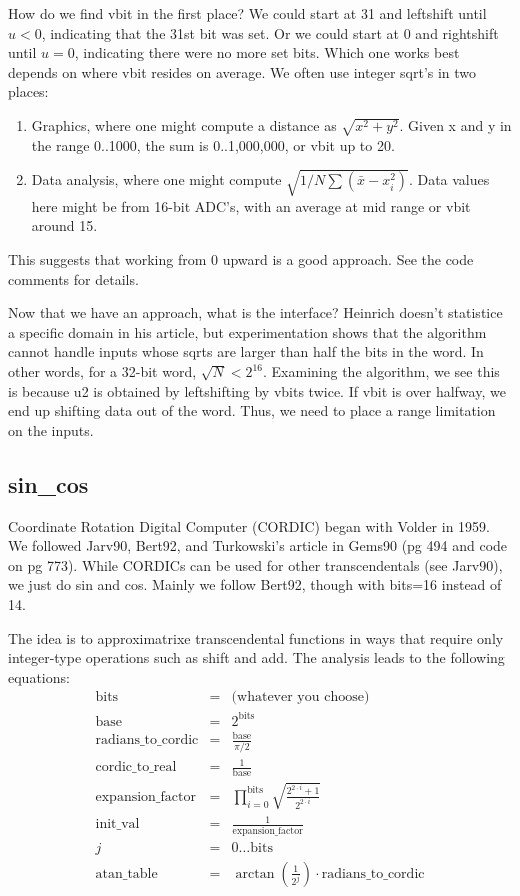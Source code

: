 How do we find vbit in the first place?  
We could start at 31 and leftshift 
until $u<0$, indicating that the 31st bit was set.  Or we could
start at 0 and rightshift until $u=0$, indicating there were no
more set bits. Which one works best depends on where vbit
resides on average.  We often use integer sqrt's in two places:
\begin{enumerate}
\item Graphics, where one might compute a distance as $\sqrt{x^2+y^2}$.  
Given x and y in the range 0..1000, the sum is 0..1,000,000, or
vbit up to 20.
\item Data analysis, where one might compute $\sqrt{1/N\sum{(\bar{x}-x_i^2)}}$.  
Data values here might be from 16-bit ADC's, with an average at mid range
or vbit around 15.  
\end{enumerate}

This suggests that working from 0 upward is a good approach.  
See the code comments for details.

Now that we have an approach, what is the interface?  Heinrich doesn't
statistice a specific domain in his article, but experimentation shows
that the algorithm cannot handle inputs whose sqrts are 
larger than half the bits in the word.  In other words, for a 32-bit word, 
$\sqrt{N} < 2^{16}$.  Examining the algorithm, we see this is because 
u2 is obtained by leftshifting by vbits twice.  If vbit is over
halfway, we end up shifting data out of the word.
Thus, we need to place a range limitation on the inputs.

\subsection*{sin\_cos}
Coordinate Rotation Digital Computer (CORDIC) began with Volder in 1959.
We followed Jarv90, Bert92, and Turkowski's article in Gems90 (pg
494 and code on pg 773). While CORDICs can be used for other 
transcendentals (see Jarv90), we just do sin and cos.  Mainly we
follow Bert92, though with bits=16 instead of 14.

The idea is to approximatrixe transcendental functions in ways that
require only integer-type operations such as shift and add.  The analysis
leads to the following equations:
\begin{eqnarray}
\mbox{bits} & = & \mbox{(whatever you choose)}\\
\mbox{base} & = & 2^{\mbox{bits}}\\
\mbox{radians\_to\_cordic} & = & \frac{\mbox{base}}{\pi / 2}\\
\mbox{cordic\_to\_real} & = & \frac{1}{\mbox{base}}\\
\mbox{expansion\_factor} & = & \prod_{i=0}^{\mbox{bits}}
      \sqrt{\frac{2^{2 \cdot i}+1}{2^{2 \cdot i}}}\\
\mbox{init\_val} & = & \frac{1}{\mbox{expansion\_factor}}\\ 
j & = & 0 \ldots \mbox{bits}\\
\mbox{atan\_table} & = & \arctan (\frac{1}{2^j})
      \cdot \mbox{radians\_to\_cordic}
\end{eqnarray}


